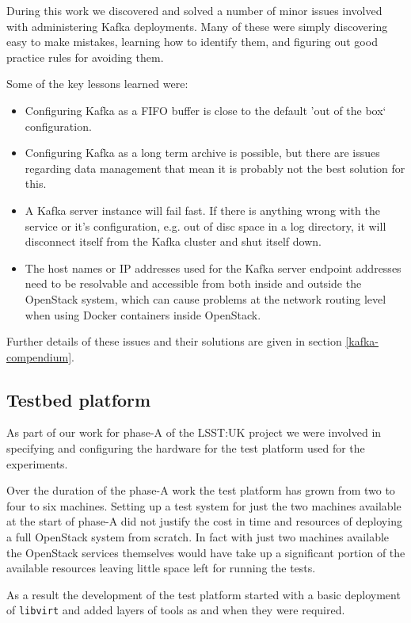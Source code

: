 \documentclass{article}
\newcommand{\docker} {Docker\xspace}
\newcommand{\openstack} {OpenStack\xspace}
\newcommand{\libvirt} {\texttt{libvirt}\xspace}
\newcommand{\kafka} {Kafka\xspace}
\newcommand{\phasea} {phase-A\xspace}
\newcommand{\lsstuk} {LSST:UK\xspace}
\newcommand{\testplatform} {test platform\xspace}
\begin{document}
During this work we discovered and solved a number of minor issues involved with administering \kafka deployments. Many of these were simply discovering easy to make mistakes, learning how to identify them, and figuring out good practice rules for avoiding them.

Some of the key lessons learned were:
\begin{itemize}
    \item Configuring \kafka as a FIFO buffer is close to the default 'out of the box` configuration.
    \item Configuring \kafka as a long term archive is possible, but there are issues regarding data management that mean it is probably not the best solution for this. 
    \item A \kafka server instance will fail fast. If there is anything wrong with the service or it's configuration, e.g. out of disc space in a log directory, it will disconnect itself from the \kafka cluster and shut itself down.
    \item The host names or IP addresses used for the \kafka server endpoint addresses need to be resolvable and accessible from both inside and outside the \openstack system, which can cause problems at the network routing level when using \docker containers inside \openstack.
\end{itemize}

Further details of these issues and their solutions are given in section \ref{kafka-compendium}.

\subsection{Testbed platform}
\label{deployment-testbed.platform}

As part of our work for \phasea of the \lsstuk project we were involved in specifying and configuring the hardware for the \testplatform used for the experiments.

Over the duration of the \phasea work the \testplatform has grown from two to four to six machines. Setting up a test system for just the two machines available at the start of \phasea did not justify the cost in time and resources of deploying a full \openstack system from scratch. In fact with just two machines available the \openstack services themselves would have take up a significant portion of the available resources leaving little space left for running the tests.

As a result the development of the \testplatform started with a basic deployment of \libvirt and added layers of tools as and when they were required.
\end{document}

